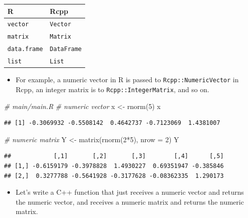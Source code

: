 \documentclass[
]{book}
\newenvironment{Shaded}{\begin{snugshade}}{\end{snugshade}}
\newcommand{\AttributeTok}[1]{\textcolor[rgb]{0.77,0.63,0.00}{#1}}
\newcommand{\CommentTok}[1]{\textcolor[rgb]{0.56,0.35,0.01}{\textit{#1}}}
\newcommand{\DecValTok}[1]{\textcolor[rgb]{0.00,0.00,0.81}{#1}}
\newcommand{\FunctionTok}[1]{\textcolor[rgb]{0.00,0.00,0.00}{#1}}
\newcommand{\NormalTok}[1]{#1}
\newcommand{\OtherTok}[1]{\textcolor[rgb]{0.56,0.35,0.01}{#1}}
\newcommand{\SpecialCharTok}[1]{\textcolor[rgb]{0.00,0.00,0.00}{#1}}
\providecommand{\tightlist}{%
  \setlength{\itemsep}{0pt}\setlength{\parskip}{0pt}}
\begin{document}
\begin{longtable}[]{@{}ll@{}}
\toprule()
R & Rcpp \\
\midrule()
\endhead
\texttt{vector} & \texttt{Vector} \\
\texttt{matrix} & \texttt{Matrix} \\
\texttt{data.frame} & \texttt{DataFrame} \\
\texttt{list} & \texttt{List} \\
\bottomrule()
\end{longtable}

\begin{itemize}
\tightlist
\item
  For example, a numeric vector in R is passed to \texttt{Rcpp::NumericVector} in Rcpp, an integer matrix is to \texttt{Rcpp::IntegerMatrix}, and so on.
\end{itemize}

\begin{Shaded}
\begin{Highlighting}[]
\CommentTok{\# main/main.R}
\CommentTok{\# numeric vector }
\NormalTok{x }\OtherTok{\textless{}{-}} \FunctionTok{rnorm}\NormalTok{(}\DecValTok{5}\NormalTok{)}
\NormalTok{x}
\end{Highlighting}
\end{Shaded}

\begin{verbatim}
## [1] -0.3069932 -0.5508142  0.4642737 -0.7123069  1.4381007
\end{verbatim}

\begin{Shaded}
\begin{Highlighting}[]
\CommentTok{\# numeric matrix}
\NormalTok{Y }\OtherTok{\textless{}{-}} \FunctionTok{matrix}\NormalTok{(}\FunctionTok{rnorm}\NormalTok{(}\DecValTok{2}\SpecialCharTok{*}\DecValTok{5}\NormalTok{), }\AttributeTok{nrow =} \DecValTok{2}\NormalTok{)}
\NormalTok{Y}
\end{Highlighting}
\end{Shaded}

\begin{verbatim}
##            [,1]       [,2]       [,3]        [,4]      [,5]
## [1,] -0.6159179 -0.3978828  1.4930227  0.69351947 -0.385846
## [2,]  0.3277788 -0.5641928 -0.3177628 -0.08362335  1.290173
\end{verbatim}

\begin{itemize}
\tightlist
\item
  Let's write a C++ function that just receives a numeric vector and returns the numeric vector, and receives a numeric matrix and returns the numeric matrix.
\end{itemize}
\end{document}
